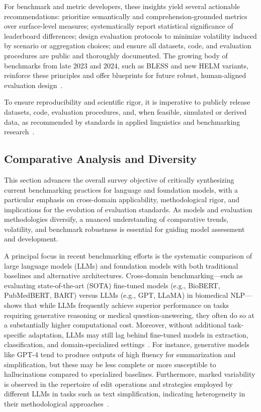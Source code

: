 \documentclass[sigconf]{acmart}
\begin{document}
For benchmark and metric developers, these insights yield several actionable recommendations: prioritize semantically and comprehension-grounded metrics over surface-level measures; systematically report statistical significance of leaderboard differences; design evaluation protocols to minimize volatility induced by scenario or aggregation choices; and ensure all datasets, code, and evaluation procedures are public and thoroughly documented. The growing body of benchmarks from late 2023 and 2024, such as BLESS and new HELM variants, reinforce these principles and offer blueprints for future robust, human-aligned evaluation design~\cite{ref101,ref104,ref106}.

To ensure reproducibility and scientific rigor, it is imperative to publicly release datasets, code, evaluation procedures, and, when feasible, simulated or derived data, as recommended by standards in applied linguistics and benchmarking research~\cite{ref108}.

\subsection{Comparative Analysis and Diversity}

This section advances the overall survey objective of critically synthesizing current benchmarking practices for language and foundation models, with a particular emphasis on cross-domain applicability, methodological rigor, and implications for the evolution of evaluation standards. As models and evaluation methodologies diversify, a nuanced understanding of comparative trends, volatility, and benchmark robustness is essential for guiding model assessment and development.

A principal focus in recent benchmarking efforts is the systematic comparison of large language models (LLMs) and foundation models with both traditional baselines and alternative architectures. Cross-domain benchmarking—such as evaluating state-of-the-art (SOTA) fine-tuned models (e.g., BioBERT, PubMedBERT, BART) versus LLMs (e.g., GPT, LLaMA) in biomedical NLP—shows that while LLMs frequently achieve superior performance on tasks requiring generative reasoning or medical question-answering, they often do so at a substantially higher computational cost. Moreover, without additional task-specific adaptation, LLMs may still lag behind fine-tuned models in extraction, classification, and domain-specialized settings~\cite{ref106}. For instance, generative models like GPT-4 tend to produce outputs of high fluency for summarization and simplification, but these may be less complete or more susceptible to hallucinations compared to specialized baselines. Furthermore, marked variability is observed in the repertoire of edit operations and strategies employed by different LLMs in tasks such as text simplification, indicating heterogeneity in their methodological approaches~\cite{ref106}.
\end{document}
